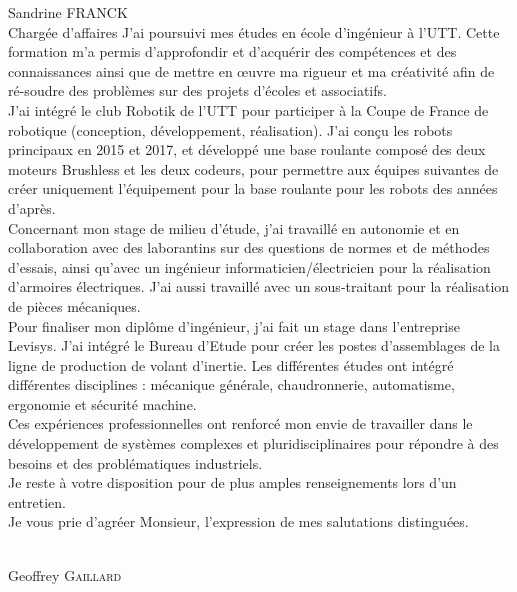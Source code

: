 \documentclass[a4paper,10pt,firstfoot=false]{scrlttr2}
\begin{document}
\begin{letter}{Sandrine FRANCK \\ Chargée d'affaires}
J’ai poursuivi mes études en école d’ingénieur à l’UTT. Cette formation m’a permis d’approfondir et d’acquérir des compétences et des connaissances ainsi que de mettre en œuvre ma rigueur et ma créativité afin de ré-soudre des problèmes sur des projets d’écoles et associatifs.\\

J'ai intégré le club Robotik de l'UTT pour participer à la Coupe de France de robotique (conception, développement, réalisation). J'ai conçu les robots principaux en 2015 et 2017, et développé une base roulante composé des deux moteurs Brushless et les deux codeurs, pour permettre aux équipes suivantes de créer uniquement l'équipement pour la base roulante pour les robots des années d'après.\\

Concernant mon stage de milieu d’étude, j’ai travaillé en autonomie et en collaboration avec des laborantins sur des questions de normes et de méthodes d’essais, ainsi qu’avec un ingénieur informaticien/électricien pour la réalisation d’armoires électriques. J’ai aussi travaillé avec un sous-traitant pour la réalisation de pièces mécaniques.\\

Pour finaliser mon diplôme d'ingénieur, j'ai fait un stage dans l'entreprise Levisys. J'ai intégré le Bureau d'Etude pour créer les postes d'assemblages de la ligne de production de volant d'inertie. Les différentes études ont intégré différentes disciplines : mécanique générale, chaudronnerie, automatisme, ergonomie et sécurité machine.\\

Ces expériences professionnelles ont renforcé mon envie de travailler dans le développement de systèmes complexes et pluridisciplinaires pour répondre à des besoins et des problématiques industriels.\\

Je reste à votre disposition pour de plus amples renseignements lors d’un entretien.\\
Je vous prie d’agréer Monsieur, l’expression de mes salutations distinguées.

\begin{flushright}
\\[6ex] Geoffrey \textsc{Gaillard}
\end{flushright}

\end{letter}
\end{document}
